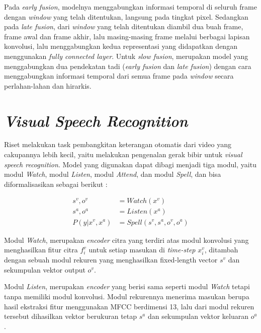 Pada \textit{early fusion}, modelnya menggabungkan informasi temporal di seluruh frame dengan \textit{window} yang telah ditentukan, langsung pada tingkat pixel. Sedangkan pada \textit{late fusion}, dari \textit{window} yang telah ditentukan diambil dua buah frame, frame awal dan frame akhir, lalu masing-masing frame melalui berbagai lapisan konvolusi, lalu menggabungkan kedua representasi yang didapatkan dengan menggunakan \textit{fully connected layer}. Untuk \textit{slow fusion}, merupakan model yang menggabungkan dua pendekatan tadi (\textit{early fusion} dan \textit{late fusion}) dengan cara menggabungkan informasi temporal dari semua frame pada \textit{window} secara perlahan-lahan dan hirarkis.


\section{\textit{Visual Speech Recognition}}

Riset \textcite{Chung2017} melakukan task pembangkitan keterangan otomatis dari video yang cakupannya lebih kecil, yaitu melakukan pengenalan gerak bibir untuk \textit{visual speech recognition}. Model yang digunakan dapat dibagi menjadi tiga modul, yaitu modul \textit{Watch}, modul \textit{Listen}, modul \textit{Attend}, dan modul \textit{Spell}, dan bisa diformalisasikan sebagai berikut \parencite{Chung2017}:

\begin{equation*}
    \begin{split}
        s^{v}, o^{v} &= Watch(x^{v}) \\
        s^{a}, o^{a} &= Listen(x^{a}) \\
        P(y|x^{v}, x^{a}) &= Spell(s^{v}, s^{a}, o^{v}, o^{a})
    \end{split}
\end{equation*}

Modul \textit{Watch}, merupakan \textit{encoder} citra yang terdiri atas modul konvolusi yang menghasilkan fitur citra \(f^{v}_{i}\) untuk setiap masukan di \textit{time-step} \(x^{v}_{i}\), ditambah dengan sebuah modul rekuren yang menghasilkan fixed-length vector \(s^{v}\) dan sekumpulan vektor output \(o^{v}\).
\bigskip

Modul \textit{Listen}, merupakan \textit{encoder} yang berisi sama seperti modul \textit{Watch} tetapi tanpa memiliki modul konvolusi. Modul rekurennya menerima masukan berupa hasil ekstraksi fitur menggunakan MFCC berdimensi 13, lalu dari modul rekuren tersebut dihasilkan vektor berukuran tetap \(s^{a}\) dan sekumpulan vektor keluaran \(o^{a}\).
\bigskip


